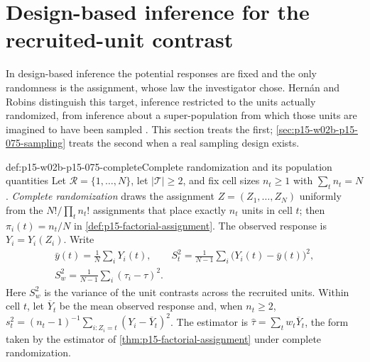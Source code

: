 \section{Design-based inference for the recruited-unit contrast}
\label{sec:p15-w02b-p15-075-design}

In design-based inference the potential responses are fixed and the only
randomness is the assignment, whose law the investigator chose. Hern\'an and
Robins distinguish this target, inference restricted to the units actually
randomized, from inference about a super-population from which those units are
imagined to have been sampled \cite[\S10.2, pp.~141--142]{HernanRobins2020WhatIf2026}.
This section treats the first; \cref{sec:p15-w02b-p15-075-sampling} treats the
second when a real sampling design exists.

\begin{hbdefinition}{def:p15-w02b-p15-075-complete}{Complete randomization and its population quantities}
Let \(\mathcal R=\{1,\ldots,N\}\), let \(|\mathcal T|\geq2\), and fix cell
sizes \(n_t\geq1\) with \(\sum_tn_t=N\). \emph{Complete randomization}
draws the assignment \(Z=(Z_1,\ldots,Z_N)\) uniformly from the
\(N!/\prod_tn_t!\) assignments that place exactly \(n_t\) units in cell
\(t\); then \(\pi_i(t)=n_t/N\) in \cref{def:p15-factorial-assignment}. The
observed response is \(Y_i=Y_i(Z_i)\). Write
\[
\begin{gathered}
 \bar y(t)=\frac1N\sum_iY_i(t),\qquad
 S_t^2=\frac1{N-1}\sum_i\bigl(Y_i(t)-\bar y(t)\bigr)^2,\\
 S_w^2=\frac1{N-1}\sum_i(\tau_i-\tau)^2 .
\end{gathered}
\]
Here \(S_w^2\) is the variance of the unit contrasts across the recruited
units. Within cell \(t\), let \(\overline Y_t\) be the mean observed
response and, when \(n_t\geq2\),
\(s_t^2=(n_t-1)^{-1}\sum_{i:Z_i=t}(Y_i-\overline Y_t)^2\). The estimator is
\(\widehat\tau=\sum_tw_t\overline Y_t\), the form taken by the estimator of
\cref{thm:p15-factorial-assignment} under complete randomization.
\end{hbdefinition}

